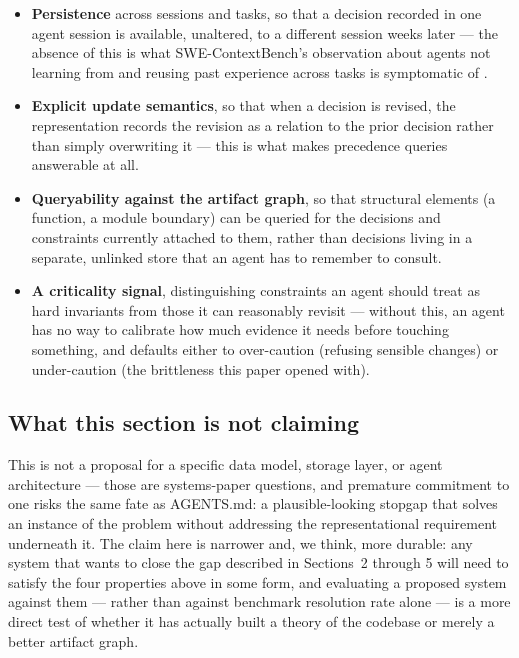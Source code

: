 \documentclass[11pt]{article}
\begin{document}
\begin{itemize}[leftmargin=*]
  \item \textbf{Persistence} across sessions and tasks, so that a decision recorded in one agent session is available, unaltered, to a different session weeks later --- the absence of this is what SWE-ContextBench's observation about agents not learning from and reusing past experience across tasks is symptomatic of \citep{zhu2026swecontextbench}.
  \item \textbf{Explicit update semantics}, so that when a decision is revised, the representation records the revision as a relation to the prior decision rather than simply overwriting it --- this is what makes precedence queries answerable at all.
  \item \textbf{Queryability against the artifact graph}, so that structural elements (a function, a module boundary) can be queried for the decisions and constraints currently attached to them, rather than decisions living in a separate, unlinked store that an agent has to remember to consult.
  \item \textbf{A criticality signal}, distinguishing constraints an agent should treat as hard invariants from those it can reasonably revisit --- without this, an agent has no way to calibrate how much evidence it needs before touching something, and defaults either to over-caution (refusing sensible changes) or under-caution (the brittleness this paper opened with).
\end{itemize}

\subsection{What this section is not claiming}

This is not a proposal for a specific data model, storage layer, or agent architecture --- those are systems-paper questions, and premature commitment to one risks the same fate as AGENTS.md: a plausible-looking stopgap that solves an instance of the problem without addressing the representational requirement underneath it. The claim here is narrower and, we think, more durable: any system that wants to close the gap described in Sections~2 through 5 will need to satisfy the four properties above in some form, and evaluating a proposed system against them --- rather than against benchmark resolution rate alone --- is a more direct test of whether it has actually built a theory of the codebase or merely a better artifact graph.
\end{document}
